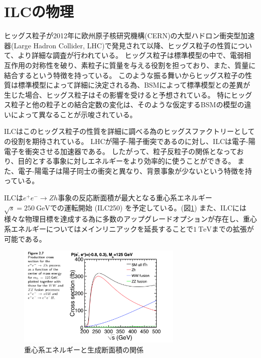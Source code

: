 \section{ILCの物理} \label{Intro:PhysicsofILC}

ヒッグス粒子が2012年に欧州原子核研究機構(CERN)の大型ハドロン衝突型加速器(Large Hadron Collider, LHC)で発見されて以降、ヒッグス粒子の性質について、より詳細な調査が行われている。
ヒッグス粒子は標準模型の中で、電弱相互作用の対称性を破り、素粒子に質量を与える役割を担っており、また、質量に結合するという特徴を持っている。
このような振る舞いからヒッグス粒子の性質は標準模型によって詳細に決定される為、BSMによって標準模型との差異が生じた場合、ヒッグス粒子はその影響を受けると予想されている。
特にヒッグス粒子と他の粒子との結合定数の変化は、そのような仮定するBSMの模型の違いによって異なることが示唆されている。

ILCはこのヒッグス粒子の性質を詳細に調べる為のヒッグスファクトリーとしての役割を期待されている。
LHCが陽子-陽子衝突であるのに対し、ILCは電子-陽電子を衝突させる加速器である。
したがって、粒子反粒子の関係となっており、目的とする事象に対しエネルギーをより効率的に使うことができる。
また、電子-陽電子は陽子同士の衝突と異なり、背景事象が少ないという特徴を持っている。

ILCは$e^+e^- \to Zh$事象の反応断面積が最大となる重心系エネルギー$\sqrt{s}=250\ \mathrm{GeV}$での運転開始 (ILC250) を予定している。(図\ref{4eetoZH})
また、ILCには様々な物理目標を達成する為に多数のアップグレードオプションが存在し、重心系エネルギーについてはメインリニアックを延長することで$1\ \mathrm{TeV}$までの拡張が可能である。

\begin{figure}[htbp]
 \centering
 \includegraphics[width=0.7\textwidth]{Figure/1Introduction/4eetoZH.png}
 \caption{重心系エネルギーと生成断面積の関係\cite{TechnicalDesignReportPhysics}}
 \label{4eetoZH}
\end{figure}

